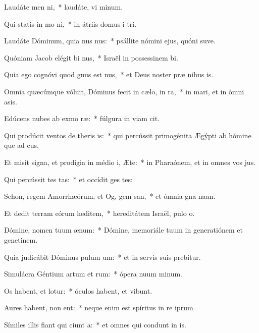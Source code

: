 \item Laudáte men ni,~* laudáte, vi minum.
\item Qui statis in mo ni,~* in átriis domus i tri.
\item Laudáte Dóminum, quia nus nus:~* psállite nómini ejus, quóni suve.
\item Quóniam Jacob elégit bi nus,~* Israël in possessinem bi.
\item Quia ego cognóvi quod gnus est nus,~* et Deus noster præ nibus is.
\item Omnia quæcúmque vóluit, Dóminus fecit in cælo,  in ra,~* in mari, et in ómni asis.
\item Edúcens nubes ab exmo ræ:~* fúlgura in viam cit.
\item Qui prodúcit ventos de theris is:~* qui percússit primogénita Ægýpti ab hómine que ad cus.
\item Et misit signa, et prodígia in médio i, Æte:~* in Pharaónem, et in omnes vos jus.
\item Qui percússit tes tas:~* et occídit ges tes:
\item Sehon, regem Amorrhæórum, et Og, gem san,~* et ómnia gna naan.
\item Et dedit terram eórum heditem,~* hereditátem Israël, pulo o.
\item Dómine, nomen tuum  ænum:~* Dómine, memoriále tuum in generatiónem et genetinem.
\item Quia judicábit Dóminus pulum um:~* et in servis suis prebitur.
\item Simulácra Géntium artum et rum:~* ópera nuum minum.
\item Os habent, et  lotur:~* óculos habent, et  vibunt.
\item Aures habent,  non ent:~* neque enim est spíritus in re iprum.
\item Símiles illis fiant qui ciunt a:~* et omnes qui condunt in is.
